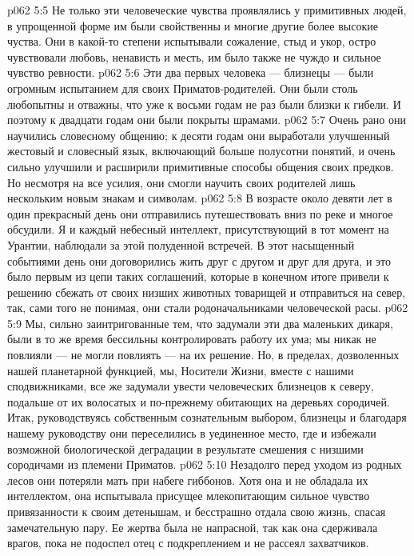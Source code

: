 \vs p062 5:5 Не только эти человеческие чувства проявлялись у примитивных людей, в упрощенной форме им были свойственны и многие другие более высокие чуства. Они в какой\hyp{}то степени испытывали сожаление, стыд и укор, остро чувствовали любовь, ненависть и месть, им было также не чуждо и сильное чувство ревности.
\vs p062 5:6 Эти два первых человека --- близнецы --- были огромным испытанием для своих Приматов\hyp{}родителей. Они были столь любопытны и отважны, что уже к восьми годам не раз были близки к гибели. И поэтому к двадцати годам они были покрыты шрамами.
\vs p062 5:7 Очень рано они научились словесному общению; к десяти годам они выработали улучшенный жестовый и словесный язык, включающий больше полусотни понятий, и очень сильно улучшили и расширили примитивные способы общения своих предков. Но несмотря на все усилия, они смогли научить своих родителей лишь нескольким новым знакам и символам.
\vs p062 5:8 В возрасте около девяти лет в один прекрасный день они отправились путешествовать вниз по реке и многое обсудили. Я и каждый небесный интеллект, присутствующий в тот момент на Урантии, наблюдали за этой полуденной встречей. В этот насыщенный событиями день они договорились жить друг с другом и друг для друга, и это было первым из цепи таких соглашений, которые в конечном итоге привели к решению сбежать от своих низших животных товарищей и отправиться на север, так, сами того не понимая, они стали родоначальниками человеческой расы.
\vs p062 5:9 Мы, сильно заинтригованные тем, что задумали эти два маленьких дикаря, были в то же время бессильны контролировать работу их ума; мы никак не повлияли --- не могли повлиять --- на их решение. Но, в пределах, дозволенных нашей планетарной функцией, мы, Носители Жизни, вместе с нашими сподвижниками, все же задумали увести человеческих близнецов к северу, подальше от их волосатых и по\hyp{}прежнему обитающих на деревьях сородичей. Итак, руководствуясь собственным сознательным выбором, близнецы  и благодаря нашему руководству они переселились  в уединенное место, где и избежали возможной биологической деградации в результате смешения с низшими сородичами из племени Приматов.
\vs p062 5:10 Незадолго перед уходом из родных лесов они потеряли мать при набеге гиббонов. Хотя она и не обладала их интеллектом, она испытывала присущее млекопитающим сильное чувство привязанности к своим детенышам, и бесстрашно отдала свою жизнь, спасая замечательную пару. Ее жертва была не напрасной, так как она сдерживала врагов, пока не подоспел отец с подкреплением и не рассеял захватчиков.
